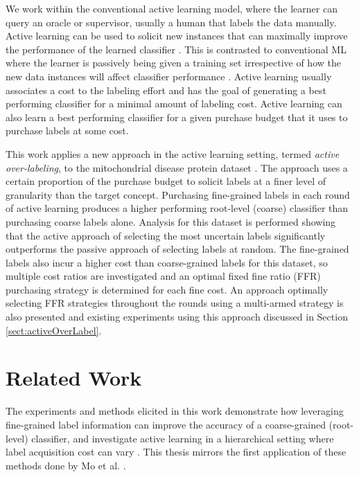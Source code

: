 \documentclass[ms]{nuthesis}
\begin{document}
 \par We work within
the conventional active learning model, where the learner can query an oracle or supervisor,
usually a human that labels the data manually. Active learning can be used to solicit new
instances that can maximally
improve the performance of the learned classifier \cite{mitchell}. This is contrasted to
conventional ML where the learner is passively being given a training set irrespective of
how the new data instances will affect classifier performance \cite{mitchell}. Active learning
usually associates a cost to the labeling effort and has the goal of generating
a best performing classifier for a minimal amount of labeling cost. Active learning
can also learn a best performing classifier for a given purchase budget that it uses to
purchase labels at some cost.

\par This work applies a new approach in the
active learning setting, termed \textit{active over-labeling}, to the mitochondrial
disease protein dataset \cite{yugi}.
The approach uses a certain proportion of the purchase budget to solicit
labels at a finer level of granularity than the target concept.
Purchasing fine-grained labels in each round of active learning produces a
higher performing root-level (coarse) classifier than purchasing coarse
labels alone. Analysis for this dataset is performed showing that
 the active approach of selecting the most uncertain labels significantly
 outperforms the passive approach of selecting labels at random.
The fine-grained labels also incur a higher cost than coarse-grained
labels for this dataset, so multiple cost ratios are investigated and an optimal fixed fine
ratio (FFR)
purchasing strategy is determined for each fine cost. An approach optimally selecting
 FFR strategies throughout the rounds using a multi-armed strategy is also presented
 and existing experiments using this approach discussed in Section \ref{sect:activeOverLabel}.




\chapter{Related Work}
\par The experiments and methods elicited in this work
demonstrate how leveraging fine-grained label  information
can improve the accuracy of a coarse-grained (root-level) classifier, and
 investigate active learning in a hierarchical setting where
 label acquisition cost can vary \cite{yugi}. This thesis mirrors the first
 application of these methods done by Mo et al. \cite{yugi}.
\end{document}
